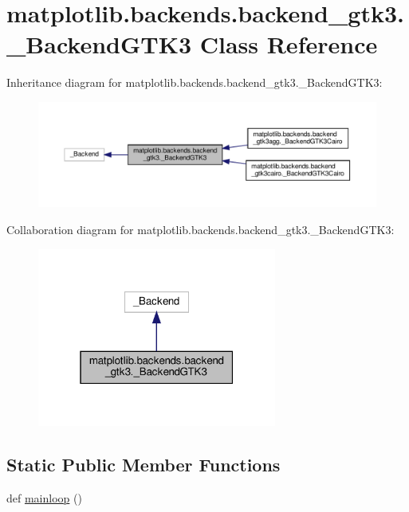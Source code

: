 \hypertarget{classmatplotlib_1_1backends_1_1backend__gtk3_1_1__BackendGTK3}{}\section{matplotlib.\+backends.\+backend\+\_\+gtk3.\+\_\+\+Backend\+G\+T\+K3 Class Reference}
\label{classmatplotlib_1_1backends_1_1backend__gtk3_1_1__BackendGTK3}


Inheritance diagram for matplotlib.\+backends.\+backend\+\_\+gtk3.\+\_\+\+Backend\+G\+T\+K3\+:
\nopagebreak
\begin{figure}[H]
\begin{center}
\leavevmode
\includegraphics[width=350pt]{classmatplotlib_1_1backends_1_1backend__gtk3_1_1__BackendGTK3__inherit__graph}
\end{center}
\end{figure}


Collaboration diagram for matplotlib.\+backends.\+backend\+\_\+gtk3.\+\_\+\+Backend\+G\+T\+K3\+:
\nopagebreak
\begin{figure}[H]
\begin{center}
\leavevmode
\includegraphics[width=223pt]{classmatplotlib_1_1backends_1_1backend__gtk3_1_1__BackendGTK3__coll__graph}
\end{center}
\end{figure}
\subsection*{Static Public Member Functions}
\begin{DoxyCompactItemize}
\item 
def \hyperlink{classmatplotlib_1_1backends_1_1backend__gtk3_1_1__BackendGTK3_aa3d41b20c9f35f250a97044f7378272b}{mainloop} ()
\end{DoxyCompactItemize}
